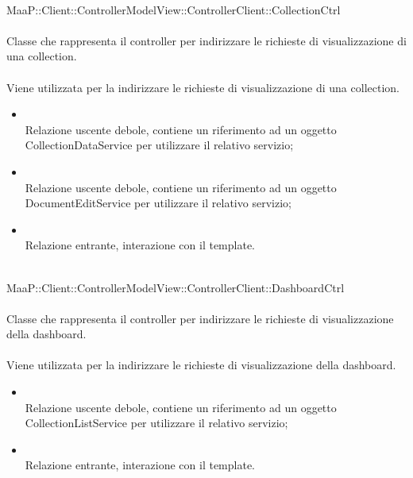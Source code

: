 \\
MaaP::Client::ControllerModelView::ControllerClient::CollectionCtrl\\
\\
Classe che rappresenta il controller per indirizzare le richieste di visualizzazione di una collection.\\
\\
Viene utilizzata per la indirizzare le richieste di visualizzazione di una collection.\\
\begin{itemize}
\item{}\\
Relazione uscente debole, contiene un riferimento ad un oggetto CollectionDataService per utilizzare il relativo servizio;
\item{}\\
Relazione uscente debole, contiene un riferimento ad un oggetto DocumentEditService per utilizzare il relativo servizio;
\item{}\\
Relazione entrante, interazione con il template.
\end{itemize}

\\
MaaP::Client::ControllerModelView::ControllerClient::DashboardCtrl\\
\\
Classe che rappresenta il controller per indirizzare le richieste di visualizzazione della dashboard.\\
\\
Viene utilizzata per la indirizzare le richieste di visualizzazione della dashboard.\\
\begin{itemize}
\item{}\\
Relazione uscente debole, contiene un riferimento ad un oggetto CollectionListService per utilizzare il relativo servizio;
\item{}\\
Relazione entrante, interazione con il template.
\end{itemize}

